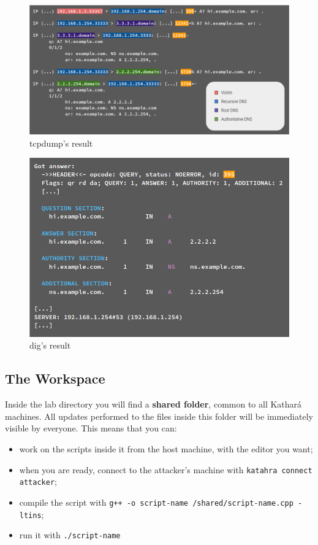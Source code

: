 \documentclass[11pt,a4paper]{article}
\begin{document}
\begin{figure}
    \centering
    \includegraphics[width=\textwidth]{tcpdump-res.png}
    \caption{tcpdump's result}
    \label{fig:tcpdump-res}
\end{figure}

\begin{figure}
    \centering
    \includegraphics[width=\textwidth]{dig-result.png}
    \caption{dig's result}
    \label{fig:dig-res}
\end{figure}

\subsection{The Workspace}

Inside the lab directory you will find a \textbf{shared folder}, common to all Kathará machines. All updates performed to the files inside this folder will be immediately visible by everyone. This means that you can:
\begin{itemize}
    \item work on the scripts inside it from the host machine, with the editor you want;
    \item when you are ready, connect to the attacker's machine with \texttt{katahra connect attacker};
    \item compile the script with \texttt{g++ -o script-name /shared/script-name.cpp -ltins};
    \item run it with \texttt{./script-name}
\end{itemize}
\end{document}
